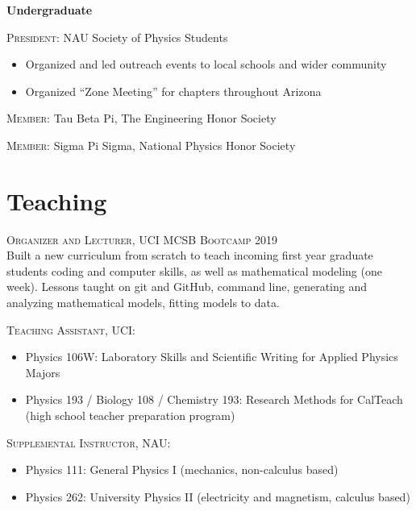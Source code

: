 \documentclass[letterpaper,10pt]{article} %
\begin{document}
\bigskip

{\large \textbf{Undergraduate}}

\textsc{President:} NAU Society of Physics Students
\begin{itemize}
\item Organized and led outreach events to local schools and wider community
\item Organized ``Zone Meeting'' for chapters throughout Arizona
\end{itemize}

\textsc{Member:} Tau Beta Pi, The Engineering Honor Society

\textsc{Member:} Sigma Pi Sigma, National Physics Honor Society

\bigskip
\section*{Teaching}
\bigskip

\textsc{Organizer and Lecturer, UCI MCSB Bootcamp 2019} \\ Built a new curriculum from scratch to teach incoming first year graduate students coding and computer skills, as well as mathematical modeling (one week). Lessons taught on git and GitHub, command line, generating and analyzing mathematical models, fitting models to data.

\textsc{Teaching Assistant, UCI:}
\begin{itemize}
\item Physics 106W: Laboratory Skills and Scientific Writing for Applied Physics Majors
\item Physics 193 / Biology 108 / Chemistry 193: Research Methods for CalTeach (high school
teacher preparation program)
\end{itemize}

\textsc{Supplemental Instructor, NAU:}
\begin{itemize}
\item Physics 111: General Physics I (mechanics, non-calculus based)
\item Physics 262: University Physics II (electricity and magnetism, calculus based)
\end{itemize}

\bigskip
\end{document}

